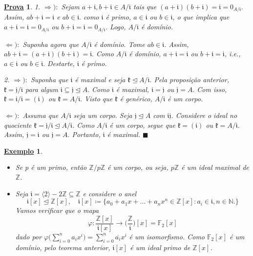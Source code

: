 \documentclass{article}
\newtheorem{example}{\underline{Exemplo}}
\newtheorem*{proof*}{\underline{Prova}}
\renewcommand\qedsymbol{$\blacksquare$}
\begin{document}
\begin{proof*}
  1. \(\Rightarrow ):\) Sejam \(a+\mathfrak{i}, b+\mathfrak{i}\in A/\mathfrak{i}\) tais que \((a+\mathfrak{i})(b+\mathfrak{i})=\mathfrak{i}=0_{A/\mathfrak{i}}.\) Assim,
  \(ab+\mathfrak{i} = \mathfrak{i}\) e \(ab\in \mathfrak{i}.\) como \(\mathfrak{i}\) é primo, \(a\in \mathfrak{i}\) ou \(b\in \mathfrak{i}\), o que implica que
  \(a+\mathfrak{i} = \mathfrak{i} = 0_{A/\mathfrak{i}}\) ou \(b+\mathfrak{i} = \mathfrak{i} = 0_{A/\mathfrak{i}}.\) Logo, \(A/\mathfrak{i}\) é domínio.

  \(\Leftarrow ):\) Suponha agora que \(A/\mathfrak{i}\) é domínio. Tome \(ab\in \mathfrak{i}\). Assim, \(ab + \mathfrak{i} = (a+\mathfrak{i})(b+\mathfrak{i}) = \mathfrak{i}.\)
  Como \(A/\mathfrak{i}\) é domínio, \(a+\mathfrak{i} = \mathfrak{i}\) ou \(b+\mathfrak{i} = \mathfrak{i}\), i.e., \(a\in \mathfrak{i}\) ou \(b\in \mathfrak{i}.\) Destarte, \(\mathfrak{i}\) é primo.

  2. \(\Rightarrow ):\) Suponha que \(\mathfrak{i}\) é maximal e seja \(\mathfrak{k}\trianglelefteq{A/\mathfrak{i}}.\) Pela proposição anterior,
  \(\mathfrak{k} = \mathfrak{j}/\mathfrak{i}\) para algum \(\mathfrak{i}\subseteq \mathfrak{j}\trianglelefteq{A}.\) Como \(\mathfrak{i}\) é maximal,
  \(\mathfrak{i}=\mathfrak{j}\) ou \(\mathfrak{j} = A.\) Com isso, \(\mathfrak{k} = \mathfrak{i}/\mathfrak{i} = (\mathfrak{i})\) ou \(\mathfrak{k} = A/\mathfrak{i}.\) 
  Visto que \(\mathfrak{k}\) é genérico, \(A/\mathfrak{i}\) é um corpo.

  \(\Leftarrow ):\) Assuma que \(A/\mathfrak{i}\) seja um corpo. Seja \(\mathfrak{j}\trianglelefteq{A}\) com \(\mathfrak{i}\mathfrak{j}\).
  Considere o ideal no quociente \(\mathfrak{k} = \mathfrak{j}/\mathfrak{i}\trianglelefteq{A/\mathfrak{i}}\). Como \(A/\mathfrak{i}\) é um corpo,
  segue que \(\mathfrak{k} = (\mathfrak{i})\) ou \(\mathfrak{k} = A/\mathfrak{i}.\) Assim, \(\mathfrak{j} = \mathfrak{i}\) ou \(\mathfrak{j} = A.\)
  Portanto, \(\mathfrak{i}\) é maximal. \qedsymbol
\end{proof*}
\begin{example}
\begin{itemize}
  \item[1)] Se p é um primo, então \(\mathbb{Z}/p \mathbb{Z}\) é um corpo, ou seja, \(p \mathbb{Z}\) é um ideal maximal de \(\mathbb{Z}.\)
  \item[2)] Seja \(\mathfrak{i} = \langle 2 \rangle - 2 \mathbb{Z}\subseteq \mathbb{Z}\) e considere o anel 
  \[
    \mathfrak{i}[x] \trianglelefteq \mathbb{Z}[x],\quad  \mathfrak{i}[x]\coloneqq \{a_{0}+a_{1}x+\dotsc +a_{n}x^{n}\in \mathbb{Z}[x]: a_{i}\in \mathfrak{i}, n\in \mathbb{N}.\}
  \]
  Vamos verificar que o mapa 
  \[
    \varphi : \frac{\mathbb{Z}[x]}{\mathfrak{i}[x]}\rightarrow \biggl(\frac{\mathbb{Z}}{\mathfrak{i}}\biggr)[x] = \mathbb{F}_{2}[x]
  \]
  dado por \(\varphi \biggl(\sum\limits_{i=0}^{n}a_{i}x^{i}\biggr) = \sum\limits_{i=0}^{n}\overline{a_{i}}x^{i}\) é um isomorfismo. Como \(\mathbb{F}_{2}[x]\) é um domínio,
pelo teorema anterior, \(\mathfrak{i}[x]\) é um ideal primo de \(\mathbb{Z}[x]\).
\end{itemize}
\end{example}
\end{document}
